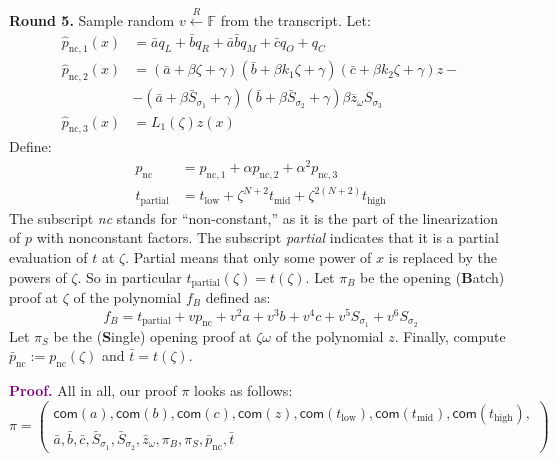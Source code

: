 \documentclass[../lecture-notes-148x210.tex]{subfiles}
\begin{document}
\textcolor{green!60!black}{\textbf{Round 5.}} Sample random $v \xleftarrow{R}
\mathbb{F}$ from the transcript. Let:
\begin{equation*}    
    \begin{aligned}
        \hat{p}_{\text{nc},1}(x) &= \bar{a}q_L + \bar{b}q_R + \bar{a}\bar{b}q_M + \bar{c}q_O + q_C \\
        \hat{p}_{\text{nc},2}(x) &= (\bar{a} + \beta \zeta + \gamma)(\bar{b} + \beta k_1 \zeta + \gamma)(\bar{c} + \beta k_2 \zeta + \gamma) z - \\
                                 &- (\bar{a} + \beta \bar{S}_{\sigma_1} + \gamma)(\bar{b} + \beta \bar{S}_{\sigma_2} + \gamma)\beta \overline{z}_{\omega}S_{\sigma_3} \\
        \hat{p}_{\text{nc},3}(x) &= L_1(\zeta)z(x)
    \end{aligned}
\end{equation*}
Define:
\begin{align*}
p_{\text{nc}} &= p_{\text{nc},1} + \alpha p_{\text{nc}, 2} + \alpha^2 p_{\text{nc}, 3} \\
t_{\text{partial}} &= t_{\text{low}} + \zeta^{N+2}t_{\text{mid}} + \zeta^{2(N+2)}t_{\text{high}}
\end{align*}
The subscript \emph{nc} stands for ``non-constant,'' as it is the part of the
linearization of $p$ with nonconstant factors. The subscript \emph{partial} indicates
that it is a partial evaluation of $t$ at $\zeta$. Partial means that only some
power of $x$ is replaced by the powers of $\zeta$. So in particular
$t_{\text{partial}}(\zeta) = t(\zeta)$. Let $\pi_B$ be the opening (\textbf{B}atch) proof at
$\zeta$ of the polynomial $f_B$ defined as: 
\[
f_B = t_{\text{partial}} + v p_{\text{nc}} + v^2 a + v^3 b + v^4 c + v^5 S_{\sigma_1} + v^6 S_{\sigma_2}
\]
Let $\pi_{S}$ be the (\textbf{S}ingle) opening proof at $\zeta\omega$ of the polynomial
$z$. Finally, compute $\bar{p}_{\text{nc}} := p_{\text{nc}}(\zeta)$ and $\bar{t} = t(\zeta)$.

\textcolor{purple}{\textbf{Proof.}} All in all, our proof $\pi$ looks as follows:
\begin{equation*}
    \pi = \begin{pmatrix}\mathsf{com}(a), \mathsf{com}(b), \mathsf{com}(c), \mathsf{com}(z), \mathsf{com}(t_{\text{low}}), \mathsf{com}(t_{\text{mid}}), \mathsf{com}(t_{\text{high}}), \\
        \bar{a}, \bar{b}, \bar{c}, \bar{S}_{\sigma_1}, \bar{S}_{\sigma_2}, \bar{z}_{\omega}, \pi_{B}, \pi_{S}, \bar{p}_{\text{nc}}, \bar{t}
    \end{pmatrix}
\end{equation*}
\end{document}
